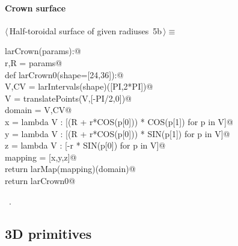 \documentclass[11pt,oneside]{article}	%
\begin{document}
\paragraph{Crown surface}
\begin{flushleft} \small \label{scrap11}
\protect{}$\langle\,$Half-toroidal surface of given radiuses\nobreak\ {\footnotesize 5b}$\,\rangle\equiv$
\vspace{-1ex}
\begin{list}{}{} \item
\mbox{}\verb@def larCrown(params):@\\
\mbox{}\verb@   r,R = params@\\
\mbox{}\verb@   def larCrown0(shape=[24,36]):@\\
\mbox{}\verb@      V,CV = larIntervals(shape)([PI,2*PI])@\\
\mbox{}\verb@      V = translatePoints(V,[-PI/2,0])@\\
\mbox{}\verb@      domain = V,CV@\\
\mbox{}\verb@      x = lambda V : [(R + r*COS(p[0])) * COS(p[1]) for p in V]@\\
\mbox{}\verb@      y = lambda V : [(R + r*COS(p[0])) * SIN(p[1]) for p in V]@\\
\mbox{}\verb@      z = lambda V : [-r * SIN(p[0]) for p in V]@\\
\mbox{}\verb@      mapping = [x,y,z]@\\
\mbox{}\verb@      return larMap(mapping)(domain)@\\
\mbox{}\verb@   return larCrown0@\\
\mbox{}\verb@@{\NWsep}
\end{list}
\vspace{-1ex}
\footnotesize\addtolength{\baselineskip}{-1ex}
\begin{list}{}{\setlength{\itemsep}{-\parsep}\setlength{\itemindent}{-\leftmargin}}
\item \NWtxtMacroRefIn\ .
\end{list}
\end{flushleft}

\subsection{3D primitives}
\end{document}

